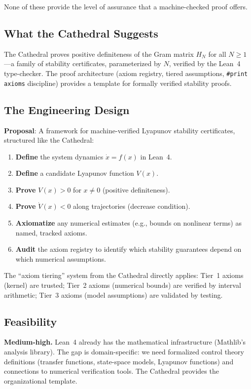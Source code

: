 \documentclass[11pt,a4paper]{article}
\begin{document}
None of these provide the level of assurance that a machine-checked
proof offers.

\subsection{What the Cathedral Suggests}

The Cathedral proves positive definiteness of the Gram matrix
$H_N$ for all $N \geq 1$---a family of stability certificates,
parameterized by $N$, verified by the Lean~4 type-checker. The
proof architecture (axiom registry, tiered assumptions,
\texttt{\#print axioms} discipline) provides a template for
formally verified stability proofs.

\subsection{The Engineering Design}

\textbf{Proposal}: A framework for machine-verified Lyapunov
stability certificates, structured like the Cathedral:

\begin{enumerate}
  \item \textbf{Define} the system dynamics $\dot{x} = f(x)$ in
    Lean~4.
  \item \textbf{Define} a candidate Lyapunov function $V(x)$.
  \item \textbf{Prove} $V(x) > 0$ for $x \neq 0$ (positive
    definiteness).
  \item \textbf{Prove} $\dot{V}(x) < 0$ along trajectories
    (decrease condition).
  \item \textbf{Axiomatize} any numerical estimates (e.g., bounds
    on nonlinear terms) as named, tracked axioms.
  \item \textbf{Audit} the axiom registry to identify which
    stability guarantees depend on which numerical assumptions.
\end{enumerate}

The ``axiom tiering'' system from the Cathedral directly applies:
Tier~1 axioms (kernel) are trusted; Tier~2 axioms (numerical bounds)
are verified by interval arithmetic; Tier~3 axioms (model
assumptions) are validated by testing.

\subsection{Feasibility}

\textbf{Medium-high.} Lean~4 already has the mathematical
infrastructure (Mathlib's analysis library). The gap is
domain-specific: we need formalized control theory definitions
(transfer functions, state-space models, Lyapunov functions) and
connections to numerical verification tools. The Cathedral provides
the organizational template.
\end{document}
